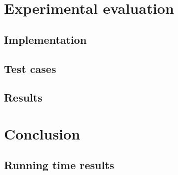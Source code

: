\documentclass[]{article}
\theoremstyle{definition}
\begin{document}
\pagebreak
\section{Experimental evaluation}


\subsection{Implementation}


\subsection{Test cases}


\subsection{Results}


\pagebreak
\section{Conclusion}


\pagebreak
\begin{appendices}
\section{Running time results}
\label{appendix:resultsexact}

\end{appendices}

\pagebreak

 
\end{document}
